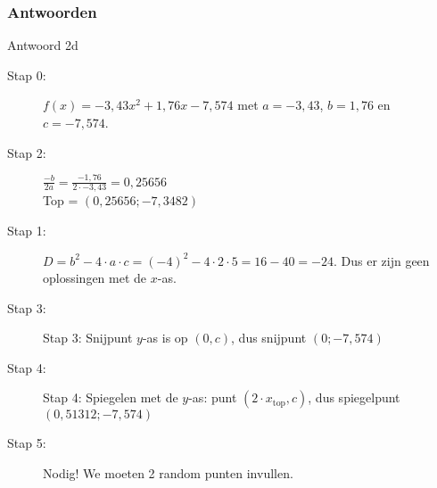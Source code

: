 \documentclass{beamer}
\begin{document}
\begin{frame}
\frametitle{Antwoorden}
\begin{block}{Antwoord 2d}
\begin{description}
 \item[Stap 0:] $f(x) = - 3,43 x^{2} + 1,76 x - 7,574 $ met $a =  -3,43 $, $b =  1,76 $ en $c =  -7,574 $.
\item[Stap 2:] $\frac{-b}{2a} = \frac{- 1,76 }{2 \cdot  -3,43 } =  0,25656$\\
Top = $( 0,25656 ; -7,3482 )$
\item[Stap 1:] $D = b^2 - 4 \cdot a \cdot c = (-4)^2 - 4 \cdot 2 \cdot 5 = 16 - 40 = -24$. Dus er zijn geen oplossingen met de $x$-as.

\item[Stap 3:] Stap 3: Snijpunt $y$-as is op $(0,c)$, dus snijpunt $(0; -7,574 )$
\item[Stap 4:] Stap 4: Spiegelen met de $y$-as: punt $(2 \cdot x_{\text{top}},c)$, dus spiegelpunt $( 0,51312 ; -7,574 )$
\item[Stap 5:] Nodig! We moeten 2 random punten invullen.
\end{description}
\end{block}
\end{frame}
\end{document}
